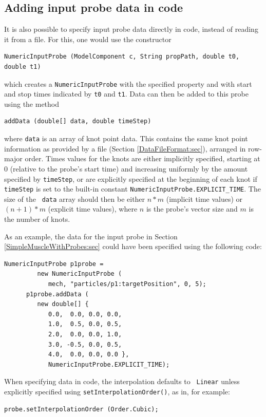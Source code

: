 \subsection{Adding input probe data in code}
\label{probeDataInCode:sec}

It is also possible to specify input probe data directly in code,
instead of reading it from a file. For this, one would use the
constructor
\begin{lstlisting}[]
   NumericInputProbe (ModelComponent c, String propPath, double t0, double t1)
\end{lstlisting}
%
which creates a {\tt NumericInputProbe} with the specified property
and with start and stop times indicated by {\tt t0} and {\tt t1}.
Data can then be added to this probe using the method
\begin{lstlisting}[]
   addData (double[] data, double timeStep)
\end{lstlisting}
%
where {\tt data} is an array of knot point data. This contains the
same knot point information as provided by a file (Section
\ref{DataFileFormat:sec}), arranged in row-major order.  Times values
for the knots are either implicitly specified, starting at 0 (relative
to the probe's start time) and increasing uniformly by the amount
specified by {\tt timeStep}, or are explicitly specified at the
beginning of each knot if {\tt timeStep} is set to the built-in
constant {\tt NumericInputProbe.EXPLICIT\_TIME}. The size of the {\tt
data} array should then be either $n*m$ (implicit time values) or
$(n+1)*m$ (explicit time values), where $n$ is the probe's vector size
and $m$ is the number of knots.

As an example, the data for the input probe in Section
\ref{SimpleMuscleWithProbes:sec} could have been specified
using the following code:
%
\begin{lstlisting}[]
      NumericInputProbe p1probe =
         new NumericInputProbe (
            mech, "particles/p1:targetPosition", 0, 5);
      p1probe.addData (
         new double[] {
            0.0,  0.0, 0.0, 0.0,
            1.0,  0.5, 0.0, 0.5,
            2.0,  0.0, 0.0, 1.0,
            3.0, -0.5, 0.0, 0.5,
            4.0,  0.0, 0.0, 0.0 },
            NumericInputProbe.EXPLICIT_TIME);
\end{lstlisting}

When specifying data in code, the interpolation defaults to {\tt
Linear} unless explicitly specified using\pdfbreak
{\tt setInterpolationOrder()}, as in, for example:
%
\begin{lstlisting}[]
   probe.setInterpolationOrder (Order.Cubic);
\end{lstlisting}
%

